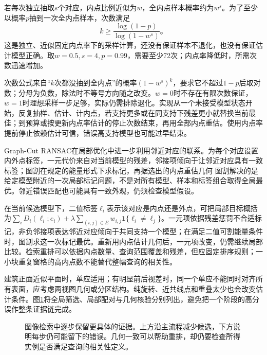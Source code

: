 若每次独立抽取$s$个对应，内点比例近似为$w$，全内点样本概率约为$w^s$。为了至少以概率$p$抽到一次全内点样本，次数满足
\begin{equation}
 k\geq\frac{\log(1-p)}{\log(1-w^s)}\text{。}
 \label{eq:vision-ransac-iterations}
\end{equation}
这是独立、近似固定内点率下的采样计算，还没有保证样本不退化，也没有保证估计模型正确。取$w=0.5,s=4,p=0.99$，需要至少72次；内点率降低时，所需次数迅速增加。

次数公式来自“$k$次都没抽到全内点”的概率$(1-w^s)^k$，要求它不超过$1-p$后取对数；分母为负数，除法时不等号方向随之改变。$w=0$时不存在有限次数保证，$w=1$时理想采样一步足够，实际仍需排除退化。实现从一个未接受模型状态开始，反复抽样、估计、计内点，若支持更多或在同支持下残差更小就替换当前最佳；到预算或按更新内点率估计的停止次数结束，再用全部内点重估。使用内点率提前停止依赖估计可信，错误高支持模型也可能过早结束。

Graph-Cut RANSAC在局部优化中进一步利用邻近对应的联系。为每个对应设置内外点标签，一元代价来自对当前模型的残差，邻接项倾向于让邻近对应具有一致标签；图割在规定的能量形式下求标记，再据选出的内点重估几何
图割解决的是给定模型附近的一次局部标记问题，不是对所有模型、样本和标签组合取得全局最优。邻近错误匹配也可能具有一致外观，仍须检查模型假设。

在当前候选模型下，二值标签$\ell_i$表示该对应是内点还是外点，可把局部目标概括为$\sum_iD_i(\ell_i;e_i)+\lambda\sum_{(i,j)\in E}w_{i,j}\mathbf1\{\ell_i\ne\ell_j\}$。一元项依据残差惩罚不合适标记，非负邻接项表达邻近对应倾向于共同支持一个模型；在满足二值可割能量条件时，图割求这一次标记最优。重新用内点估计几何后，一元项改变，仍需继续局部比较。检索重排可以依据内点数量、查询范围覆盖和残差，但应固定排序规则；一小块重复窗格的高内点数不能替代整幅查询的相关性。

建筑正面近似平面时，单应适用；有明显前后视差时，同一个单应不能同时对齐所有表面，应考虑两视图几何或分区结构。纯旋转、近共线点和重叠太少也会改变估计条件。图\ref{fig:vision-retrieval-evidence}将全局筛选、局部配对与几何核验分别列出，避免把一个阶段的高分误作整条证据链完成。

\begin{figure}[htbp]
 \centering
 
 \caption{图像检索中逐步保留更具体的证据。上方沿主流程减少候选，下方说明每步仍可能留下的错误。几何一致可以帮助重排，却仍要检查所得实例是否满足查询的相关性定义。}
 \label{fig:vision-retrieval-evidence}
\end{figure}


